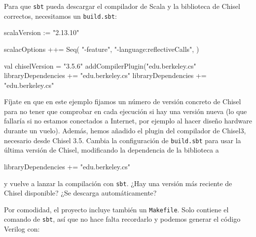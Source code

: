 \documentclass[%
    10pt,
    headinclude, footinclude=false,
    openright, %
    notitlepage,
    cleardoublepage=empty,
    headsepline,
    numbers=noenddot,
    bibliography=totoc, index=totoc,
    ]{scrbook}
\newcommand{\code}[1]{{\lstinline[basicstyle=\small\ttfamily]{#1}}}
\begin{document}
Para que \code{sbt} pueda descargar el compilador de Scala y la biblioteca de Chisel correctos,
necesitamos un \code{build.sbt}:

\begin{chisel}
scalaVersion := "2.13.10"

scalacOptions ++= Seq(
  "-feature",
  "-language:reflectiveCalls",
)

val chiselVersion = "3.5.6"
addCompilerPlugin("edu.berkeley.cs" %
libraryDependencies += "edu.berkeley.cs" %
libraryDependencies += "edu.berkeley.cs" %
\end{chisel}


\noindent Fíjate en que en este ejemplo fijamos un número de versión concreto de Chisel para no tener que
comprobar en cada ejecución si hay una versión nueva (lo que fallaría si no estamos conectados a Internet,
por ejemplo al hacer diseño hardware durante un vuelo). Además, hemos añadido el plugin del compilador
de Chisel3, necesario desde Chisel 3.5.
Cambia la configuración de \code{build.sbt} para usar la última versión de Chisel, modificando la
dependencia de la biblioteca a

\begin{chisel}
libraryDependencies += "edu.berkeley.cs" %
\end{chisel}


\noindent y vuelve a lanzar la compilación con \code{sbt}. ¿Hay una versión más reciente de Chisel
disponible? ¿Se descarga automáticamente?


Por comodidad, el proyecto incluye también un \code{Makefile}.
Solo contiene el comando de \code{sbt}, así que no hace falta recordarlo y
podemos generar el código Verilog con:
\end{document}
